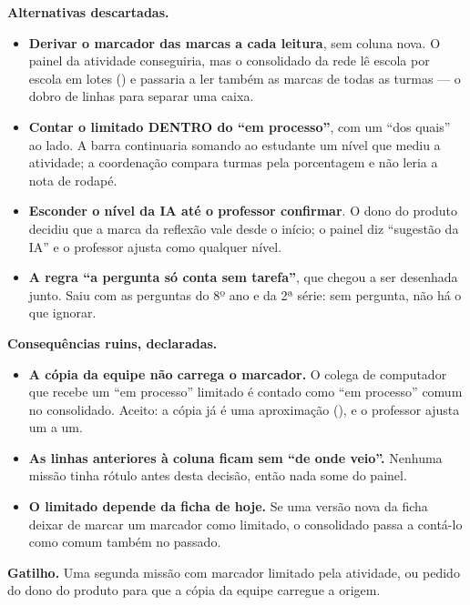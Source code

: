 \textbf{Alternativas descartadas.}

\begin{itemize}
  \item \textbf{Derivar o marcador das marcas a cada leitura}, sem coluna
    nova. O painel da atividade conseguiria, mas o consolidado da rede lê
    escola por escola em lotes () e passaria a ler também as
    marcas de todas as turmas --- o dobro de linhas para separar uma caixa.
  \item \textbf{Contar o limitado DENTRO do \enquote{em processo}}, com um
    \enquote{dos quais} ao lado. A barra continuaria somando ao estudante um
    nível que mediu a atividade; a coordenação compara turmas pela porcentagem
    e não leria a nota de rodapé.
  \item \textbf{Esconder o nível da IA até o professor confirmar}. O dono do
    produto decidiu que a marca da reflexão vale desde o início; o painel diz
    \enquote{sugestão da IA} e o professor ajusta como qualquer nível.
  \item \textbf{A regra \enquote{a pergunta só conta sem tarefa}}, que chegou a
    ser desenhada junto. Saiu com as perguntas do 8º ano e da 2ª série: sem
    pergunta, não há o que ignorar.
\end{itemize}

\textbf{Consequências ruins, declaradas.}

\begin{itemize}
  \item \textbf{A cópia da equipe não carrega o marcador.} O colega de
    computador que recebe um \enquote{em processo} limitado é contado como
    \enquote{em processo} comum no consolidado. Aceito: a cópia já é uma
    aproximação (), e o professor ajusta um a um.
  \item \textbf{As linhas anteriores à coluna ficam sem \enquote{de onde
    veio}.} Nenhuma missão tinha rótulo antes desta decisão, então nada some do
    painel.
  \item \textbf{O limitado depende da ficha de hoje.} Se uma versão nova da
    ficha deixar de marcar um marcador como limitado, o consolidado passa a
    contá-lo como comum também no passado.
\end{itemize}

\textbf{Gatilho.} Uma segunda missão com marcador limitado pela atividade, ou
pedido do dono do produto para que a cópia da equipe carregue a origem.

